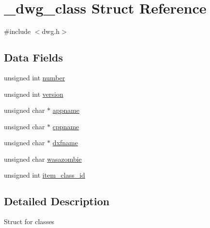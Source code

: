 \hypertarget{struct__dwg__class}{\section{\-\_\-dwg\-\_\-class \-Struct \-Reference}
\label{struct__dwg__class}
}


{\ttfamily \#include $<$dwg.\-h$>$}

\subsection*{\-Data \-Fields}
\begin{DoxyCompactItemize}
\item 
unsigned int \hyperlink{struct__dwg__class_a5c5cb7695f660cb9c42e6e8abf6920e8}{number}
\item 
unsigned int \hyperlink{struct__dwg__class_a1d7935bc0af8dd01ff07a8f40d5f86ad}{version}
\item 
unsigned char $\ast$ \hyperlink{struct__dwg__class_a82d2c46f2ac92d33d793a62667cea93e}{appname}
\item 
unsigned char $\ast$ \hyperlink{struct__dwg__class_a5cba8c7723f09460ca272f70f5d143d7}{cppname}
\item 
unsigned char $\ast$ \hyperlink{struct__dwg__class_a2988169f0ccbf35cdb1bdc3aaddf25a6}{dxfname}
\item 
unsigned char \hyperlink{struct__dwg__class_a2adf59013bca7c0135b6442739d90625}{wasazombie}
\item 
unsigned int \hyperlink{struct__dwg__class_a9336c9251fa7e5ac3ee4496e087c738b}{item\-\_\-class\-\_\-id}
\end{DoxyCompactItemize}


\subsection{\-Detailed \-Description}
\-Struct for classes 


